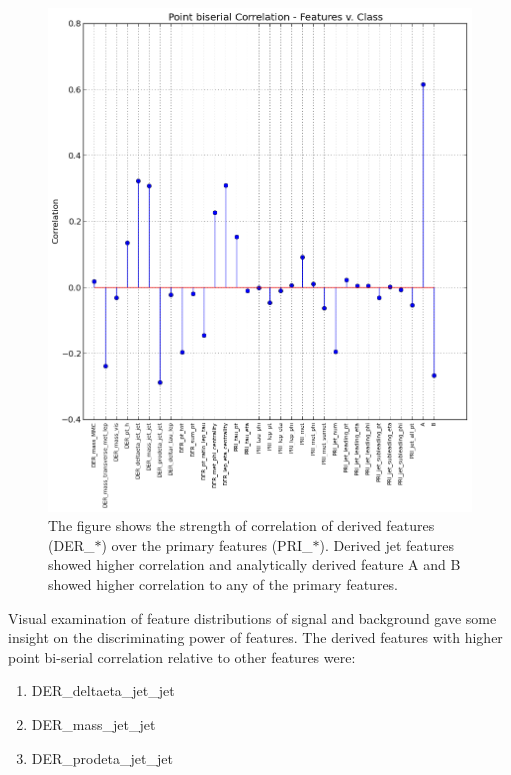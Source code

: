 \documentclass[final,3p,times,twocolumn]{elsarticle}
\begin{document}
\begin{figure}
\hspace{1.8cm}
\includegraphics[scale=0.6]{Images/BiSerialCorr.png}
\caption{The figure shows the strength of correlation of derived features (DER\_$*$) over the primary features (PRI\_$*$). Derived jet features showed higher correlation and analytically derived feature A and B showed higher correlation to any of the primary features.}
\label{biserial}
\end{figure}

Visual examination of feature distributions of signal and background gave some insight on the discriminating power of features. The derived features with higher point bi-serial correlation relative to other features were:

\begin{enumerate}[noitemsep]
\item{DER\_deltaeta\_jet\_jet}
\item{DER\_mass\_jet\_jet}
\item{DER\_prodeta\_jet\_jet}
\end{enumerate} 
\end{document}
